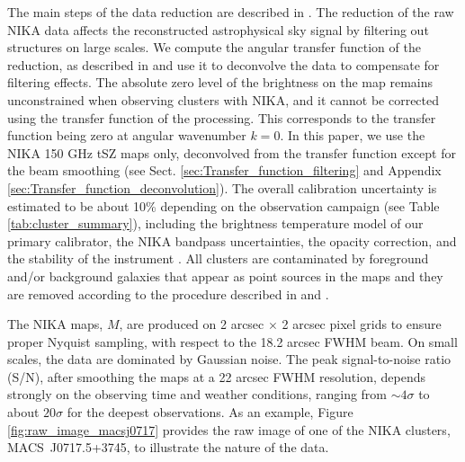 \documentclass[traditabstract]{aa}
\begin{document}
The main steps of the data reduction are described in \cite{Adam2014,Adam2015}. The reduction of the raw NIKA data affects the reconstructed astrophysical sky signal by filtering out structures on large scales. We compute the angular transfer function of the reduction, as described in \cite{Adam2015} and use it to deconvolve the data to compensate for filtering effects. The absolute zero level of the brightness on the map remains unconstrained when observing clusters with NIKA, and it cannot be corrected using the transfer function of the processing. This corresponds to the transfer function being zero at angular wavenumber $k = 0$. In this paper, we use the NIKA 150 GHz tSZ maps only, deconvolved from the transfer function except for the beam smoothing (see Sect. \ref{sec:Transfer_function_filtering} and Appendix \ref{sec:Transfer_function_deconvolution}). The overall calibration uncertainty is estimated to be about 10\% depending on the observation campaign (see Table \ref{tab:cluster_summary}), including the brightness temperature model of our primary calibrator, the NIKA bandpass uncertainties, the opacity correction, and the stability of the instrument \citep{Catalano2014}. All clusters are contaminated by foreground and/or background galaxies that appear as point sources in the maps and they are removed according to the procedure described in \cite{Adam2015} and \cite{Adam2016a}. 

The NIKA maps, $M$, are produced on 2 arcsec $\times$ 2 arcsec pixel grids to ensure proper Nyquist sampling, with respect to the 18.2 arcsec FWHM beam. On small scales, the data are dominated by Gaussian noise. The peak signal-to-noise ratio (S/N), after smoothing the maps at a 22 arcsec FWHM resolution, depends strongly on the observing time and weather conditions, ranging from $\sim 4 \sigma$ to about $20 \sigma$ for the deepest observations. As an example, Figure \ref{fig:raw_image_macsj0717} provides the raw image of one of the NIKA clusters, \mbox{MACS~J0717.5+3745}, to illustrate the nature of the data.
\end{document}
